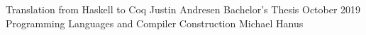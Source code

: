 \documentclass[10pt]{book}
\begin{document}
\frontmatter

\studtitlepage%
  {Translation from Haskell to Coq}
  {}%
  {Justin Andresen}%
  {Bachelor's Thesis}%
  {October 2019}%
  {Programming Languages and Compiler Construction}%
  {Michael Hanus}
\cleardoublepage
\eidesstatt


\tableofcontents

\setlength{\parindent}{0em}
\setlength{\parskip}{1em}

\mainmatter







\appendix

\backmatter
\nocite{*} %
\tocbibliography
\end{document}
